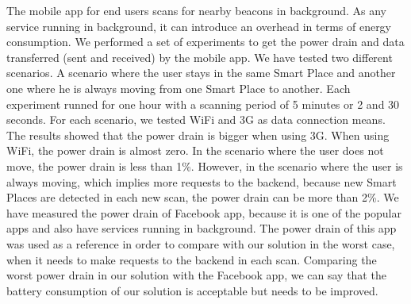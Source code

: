The mobile app for end users scans for nearby beacons in background.
As any service running in background, it can introduce an overhead in terms of energy consumption.
We performed a set of experiments to get the power drain and data transferred (sent and received) by the mobile app.
We have tested two different scenarios. A scenario where the user stays in the same Smart Place and another one where he is always moving from one Smart Place to another.
Each experiment runned for one hour with a scanning period of 5 minutes or 2 and 30 seconds.
For each scenario, we tested \gls{WiFi} and \gls{3G} as data connection means.
The results showed that the power drain is bigger when using \gls{3G}. When using \gls{WiFi}, the power drain is almost zero.
In the scenario where the user does not move, the power drain is less than 1\%.
However, in the scenario where the user is always moving, which implies more requests to the backend, because new Smart Places are detected in each new scan, the power drain can be more than 2\%.
We have measured the power drain of Facebook app, because it is one of the popular apps and also have services running in background.
The power drain of this app was used as a reference in order to compare with our solution in the worst case, when it needs to make requests to the backend in each scan.
Comparing the worst power drain in our solution with the Facebook app, we can say that the battery consumption of our solution is acceptable but needs to be improved.
